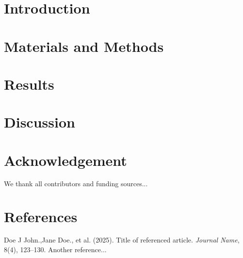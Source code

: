 \documentclass[11pt]{extarticle}
\begin{document}
\clearpage

\pagestyle{mainstyle}

\setcounter{page}{1}


\section*{Introduction}
\lipsum[1-3]

\section*{Materials and Methods}
\lipsum[4-6]

\section*{Results}
\lipsum[7-9]

\section*{Discussion}
\lipsum[10-12]

\section*{Acknowledgement}
We thank all contributors and funding sources...

\section*{References}
\begin{thebibliography}{9}
 Doe J John.,Jane Doe., et al. (2025). Title of referenced article. \textit{Journal Name}, 8(4), 123–130.
 Another reference...
\end{thebibliography}
\end{document}
